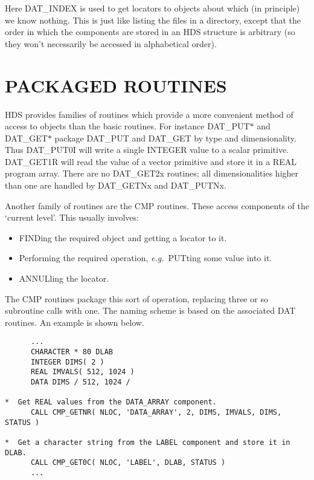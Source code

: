 Here DAT\_INDEX is used to get locators to objects about which (in
principle) we know nothing. This is just like listing the files in a
directory, except that the order in which the components are stored in an
HDS structure is arbitrary (so they won't necessarily be accessed in
alphabetical order). 

\section{PACKAGED ROUTINES}
HDS provides families of routines which provide a more convenient method of
access to objects than the basic routines. For instance DAT\_PUT$*$ and
DAT\_GET$*$ package DAT\_PUT and DAT\_GET by type and
dimensionality. Thus DAT\_PUT0I will write a single INTEGER value to a
scalar primitive. DAT\_GET1R will read the value of a vector primitive
and store it in a REAL program array. There are no DAT\_GET2x
routines; all dimensionalities higher than one are handled by 
DAT\_GETNx and DAT\_PUTNx. 

Another family of routines are the CMP routines. These access components of
the `current level'. This usually involves: 

\begin{itemize}

\item FINDing the required object and getting a locator to it.

\item Performing the required operation, {\em e.g.}\ PUTting some value into
it.

\item ANNULling the locator.

\end{itemize}

The CMP routines package this sort of operation, replacing three or so
subroutine calls with one. The naming scheme is based on the associated DAT
routines. An example is shown below. 

\small
\begin{verbatim}
      ...
      CHARACTER * 80 DLAB
      INTEGER DIMS( 2 )
      REAL IMVALS( 512, 1024 )
      DATA DIMS / 512, 1024 /

*  Get REAL values from the DATA_ARRAY component.
      CALL CMP_GETNR( NLOC, 'DATA_ARRAY', 2, DIMS, IMVALS, DIMS, STATUS )

*  Get a character string from the LABEL component and store it in DLAB.
      CALL CMP_GET0C( NLOC, 'LABEL', DLAB, STATUS )
      ...
\end{verbatim}
\normalsize


